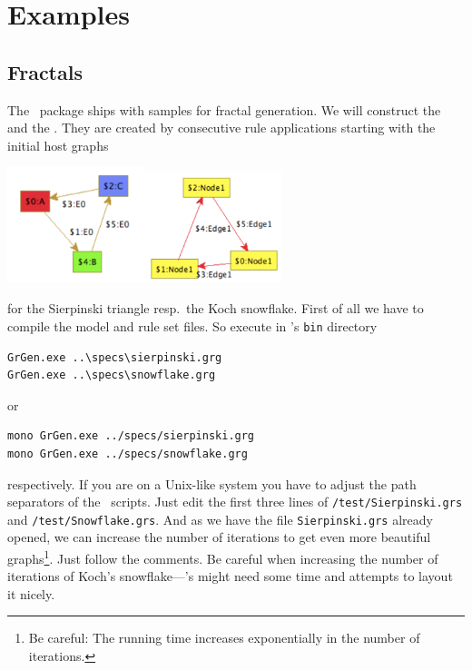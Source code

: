 \chapter{Examples}
\label{anexample}

\section{Fractals}
\label{fractals}
The \GrG\ package ships with samples for fractal generation. We will construct the  and the . They are created by consecutive rule applications starting with the initial host graphs
\begin{center}
\includegraphics[width=4cm]{fig/startsir}\quad\quad\includegraphics[width=4cm]{fig/startkoch}
\end{center}
for the Sierpinski triangle resp.\ the Koch snowflake.
First of all we have to compile the model and rule set files. So execute in \GrG's \texttt{bin} directory
\begin{verbatim}
GrGen.exe ..\specs\sierpinski.grg
GrGen.exe ..\specs\snowflake.grg
\end{verbatim}
or
\begin{verbatim}
mono GrGen.exe ../specs/sierpinski.grg
mono GrGen.exe ../specs/snowflake.grg
\end{verbatim}
respectively. If you are on a Unix-like system you have to adjust the path separators of the \GrShell\ scripts. Just edit the first three lines of \texttt{/test/Sierpinski.grs} and \texttt{/test/Snowflake.grs}. And as we have the file \texttt{Sierpinski.grs} already opened, we can increase the number of iterations to get even more beautiful graphs\footnote{Be careful: The running time increases exponentially in the number of iterations.}. Just follow the comments. Be careful when increasing the number of iterations of Koch's snowflake---\yComp's  might need some time and attempts to layout it nicely.
